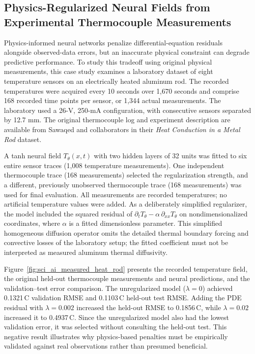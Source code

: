 \subsection{Physics-Regularized Neural Fields from Experimental Thermocouple Measurements}
\label{sec:sci_ai_measured_heat_rod}
Physics-informed neural networks penalize differential-equation residuals alongside observed-data errors, but an inaccurate physical constraint can degrade predictive performance. To study this tradeoff using original physical measurements, this case study examines a laboratory dataset of eight temperature sensors on an electrically heated aluminum rod. The recorded temperatures were acquired every 10 seconds over 1,670 seconds and comprise 168 recorded time points per sensor, or 1,344 actual measurements. The laboratory used a 26-V, 250-mA configuration, with consecutive sensors separated by 12.7 mm. The original thermocouple log and experiment description are available from Sawaqed and collaborators in their \emph{Heat Conduction in a Metal Rod} dataset.

A tanh neural field $T_\theta(x,t)$ with two hidden layers of 32 units was fitted to six entire sensor traces (1,008 temperature measurements). One independent thermocouple trace (168 measurements) selected the regularization strength, and a different, previously unobserved thermocouple trace (168 measurements) was used for final evaluation. All measurements are recorded temperatures; no artificial temperature values were added. As a deliberately simplified regularizer, the model included the squared residual of $\partial_t T_\theta-\alpha\,\partial_{xx}T_\theta$ on nondimensionalized coordinates, where $\alpha$ is a fitted dimensionless parameter. This simplified homogeneous diffusion operator omits the detailed thermal boundary forcing and convective losses of the laboratory setup; the fitted coefficient must not be interpreted as measured aluminum thermal diffusivity.

Figure~\ref{fig:sci_ai_measured_heat_rod} presents the recorded temperature field, the original held-out thermocouple measurements and neural predictions, and the validation--test error comparison. The unregularized model ($\lambda=0$) achieved 0.1321\,\textdegree C validation RMSE and 0.1103\,\textdegree C held-out test RMSE. Adding the PDE residual with $\lambda=0.002$ increased the held-out RMSE to 0.1856\,\textdegree C, while $\lambda=0.02$ increased it to 0.4937\,\textdegree C. Since the unregularized model also had the lowest validation error, it was selected without consulting the held-out test. This negative result illustrates why physics-based penalties must be empirically validated against real observations rather than presumed beneficial.

